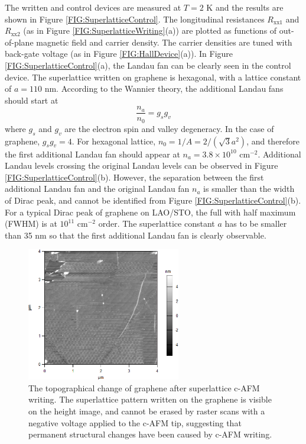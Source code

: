 \documentclass[pdflatex, sectionletters, 12pt]{pittetd}    %
\begin{document}
The written and control devices are measured at $T = 2$ K and the results are shown in Figure \ref{FIG:SuperlatticeControl}. The longitudinal resistances $R_\mathrm{xx1}$ and $R_\mathrm{xx2}$ (as in Figure \ref{FIG:SuperlatticeWriting}(a)) are plotted as functions of out-of-plane magnetic field and carrier density. The carrier densities are tuned with back-gate voltage (as in Figure \ref{FIG:HallDevice}(a)). In Figure \ref{FIG:SuperlatticeControl}(a), the Landau fan can be clearly seen in the control device. The superlattice written on graphene is hexagonal, with a lattice constant of $a = 110$ nm. According to the Wannier theory, the additional Landau fans should start at\cite{dean2013hofstadter} 
$$
\frac{n_a}{n_0} = g_s g_v
$$
where $g_s$ and $g_v$ are the electron spin and valley degeneracy. In the case of graphene, $g_s g_v = 4$. For hexagonal lattice, $n_0 = 1/A = 2 / (\sqrt{3} a^2)$, and therefore the first additional Landau fan should appear at $n_a = 3.8 \times 10^{10}$ cm$^{-2}$. Additional Landau levels crossing the original Landau levels can be observed in Figure \ref{FIG:SuperlatticeControl}(b). However, the separation between the first additional Landau fan and the original Landau fan $n_a$ is smaller than the width of Dirac peak, and cannot be identified from Figure \ref{FIG:SuperlatticeControl}(b). For a typical Dirac peak of graphene on LAO/STO, the full with half maximum (FWHM) is at $10^{11}$ cm$^{-2}$ order. The superlattice constant $a$ has to be smaller than 35 nm so that the first additional Landau fan is clearly observable.
\\

\begin{figure}[h!]
	\centering
	\includegraphics[width=0.6\textwidth]{Drawing/SuperlatticeDamage.png}
	\caption{The topographical change of graphene after superlattice c-AFM writing. The superlattice pattern written on the graphene is visible on the height image, and cannot be erased by raster scans with a negative voltage applied to the c-AFM tip, suggesting that permanent structural changes have been caused by c-AFM writing.}
	\label{FIG:SuperlatticeDamage}
\end{figure}
\end{document}
